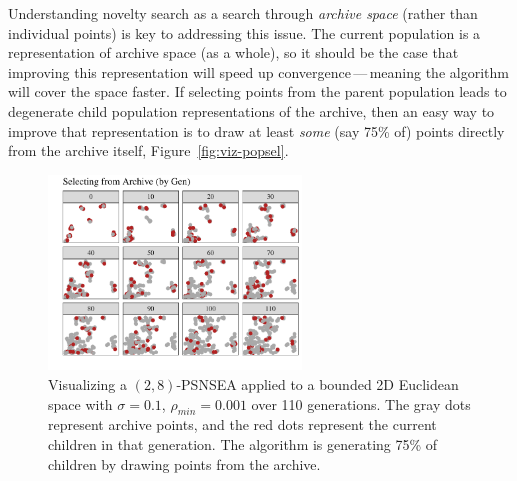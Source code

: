 \documentclass[twoside]{article}
\begin{document}
Understanding novelty search as a search through \emph{archive space} (rather than individual points) is key to addressing this issue.  The current population is a representation of archive space (as a whole), so it should be the case that improving this representation will speed up convergence\,---\,meaning the algorithm will cover the space faster.  If selecting points from the parent population leads to degenerate child population representations of the archive, then an easy way to improve that representation is to draw at least \emph{some} (say 75\% of) points directly from the archive itself, Figure~\ref{fig:viz-popsel}.   
%
\begin{figure}[h]
  \center\includegraphics[width=0.6\textwidth]{Figures/viz-archive-and-pop-s01-r0001-mu16lam32-archsell.pdf}
  \caption{\label{fig:viz-archsell} Visualizing a $(2,8)$-PSNSEA applied to a bounded 2D Euclidean space with $\sigma=0.1$, $\rho_{min}=0.001$ over 110 generations.  The gray dots represent archive points, and the red dots represent the current children in that generation.  The algorithm is generating 75\% of children by drawing points from the archive.}
\end{figure}
\end{document}
